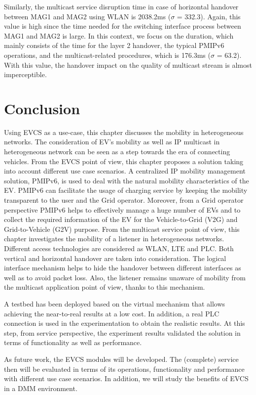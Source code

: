 Similarly, the multicast service disruption time in case of horizontal handover between MAG1 and MAG2 using WLAN is 2038.2ms ($\sigma$ = 332.3). Again, this value is high since the time needed for the switching interface process between MAG1 and MAG2 is large. In this context, we focus on the duration, which mainly consists of the time for the layer 2 handover, the typical PMIPv6 operations, and the multicast-related procedures, which is 176.3ms ($\sigma$ = 63.2). With this value, the handover impact on the quality of multicast stream is almost imperceptible. 

\section{Conclusion} \label{ch8:conclusion}
Using EVCS as a use-case, this chapter discusses the mobility in heterogeneous networks. The consideration of EV's mobility as well as IP multicast in heterogeneous network can be seen as a step towards the era of connecting vehicles.  
From the EVCS point of view, this chapter proposes a solution taking into account different use case scenarios. A centralized IP mobility management solution, PMIPv6, is used to deal with the natural mobility characteristics of the EV. PMIPv6 can facilitate the usage of charging service by keeping the mobility transparent to the user and the Grid operator. Moreover, from a Grid operator perspective PMIPv6 helps to effectively manage a huge number of EVs and to collect the required information of the EV for the Vehicle-to-Grid (V2G) and Grid-to-Vehicle (G2V) purpose. From the multicast service point of view, this chapter investigates the mobility of a listener in heterogeneous networks. Different access technologies are considered as WLAN, LTE and PLC. Both vertical and horizontal handover are taken into consideration. The logical interface mechanism helps to hide the handover between different interfaces as well as to avoid packet loss. Also, the listener remains unaware of mobility from the multicast application point of view, thanks to this mechanism. 

A testbed has been deployed based on the virtual mechanism that allows achieving the near-to-real results at a low cost. In addition, a real PLC connection is used in the experimentation to obtain the realistic results. At this step, from service perspective, the experiment results validated the solution in terms of functionality as well as performance. 

As future work, the EVCS modules will be developed. The (complete) service then will be evaluated in terms of its operations, functionality and performance with different use case scenarios. In addition, we will study the benefits of EVCS in a DMM environment. 



